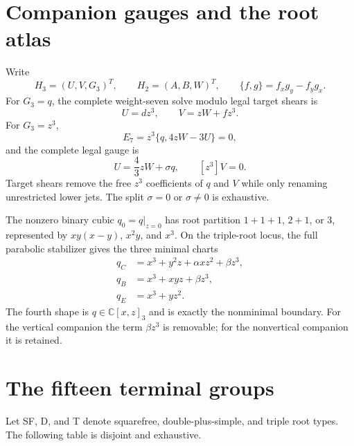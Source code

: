 \documentclass[11pt]{article}
\theoremstyle{remark}
\newcommand{\C}{\mathbb C}
\begin{document}
\section{Companion gauges and the root atlas}

Write
\[
 H_3=(U,V,G_3)^T,\qquad H_2=(A,B,W)^T,\qquad
 \{f,g\}=f_xg_y-f_yg_x.
\]
For $G_3=q$, the complete weight-seven solve modulo legal target shears is
\begin{equation}
 U=dz^3,\qquad V=zW+fz^3.                             \label{eq:nonvertgauge}
\end{equation}
For $G_3=z^3$,
\[
 E_7=z^3\{q,4zW-3U\}=0,
\]
and the complete legal gauge is
\begin{equation}
 U=\frac43zW+\sigma q,\qquad [z^3]V=0.               \label{eq:vertgauge}
\end{equation}
Target shears remove the free $z^3$ coefficients of $q$ and $V$ while
only renaming unrestricted lower jets.  The split $\sigma=0$ or
$\sigma\ne0$ is exhaustive.

The nonzero binary cubic $q_0=q|_{z=0}$ has root partition
$1+1+1$, $2+1$, or $3$, represented by $xy(x-y)$, $x^2y$, and $x^3$.
On the triple-root locus, the full parabolic stabilizer gives the three
minimal charts
\begin{equation}
\begin{aligned}
 q_C&=x^3+y^2z+\alpha xz^2+\beta z^3,\\
 q_B&=x^3+xyz+\beta z^3,\\
 q_E&=x^3+yz^2.
\end{aligned}                                        \label{eq:tripleatlas}
\end{equation}
The fourth shape is $q\in\C[x,z]_3$ and is exactly the nonminimal
boundary.  For the vertical companion the term $\beta z^3$ is removable;
for the nonvertical companion it is retained.

\section{The fifteen terminal groups}

Let SF, D, and T denote squarefree, double-plus-simple, and triple root
types.  The following table is disjoint and exhaustive.
\end{document}
